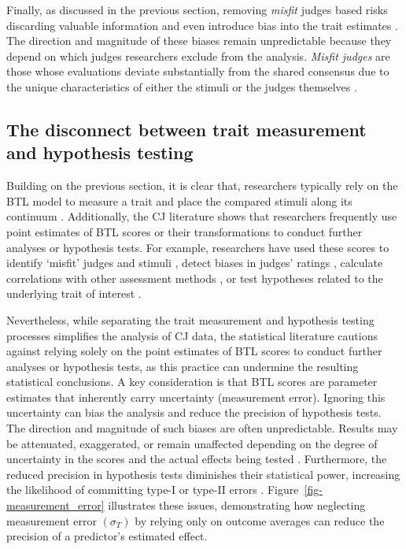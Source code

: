 \documentclass[
  authoryear,
  review,
  1p]{elsarticle}
\begin{document}
Finally, as discussed in the previous section, removing \emph{misfit}
judges based risks discarding valuable information and even introduce
bias into the trait estimates
\citep[chap.~12]{Zimmerman_1994, McElreath_2020}. The direction and
magnitude of these biases remain unpredictable because they depend on
which judges researchers exclude from the analysis. \emph{Misfit judges}
are those whose evaluations deviate substantially from the shared
consensus due to the unique characteristics of either the stimuli or the
judges themselves
\citep{Pollitt_2012a, Pollitt_2012b, vanDaal_et_al_2016, Goossens_et_al_2018}.

\subsection{The disconnect between trait measurement and hypothesis
testing}\label{sec-theory-issue2}

Building on the previous section, it is clear that, researchers
typically rely on the BTL model to measure a trait and place the
compared stimuli along its continuum \citep{Thurstone_1927b}.
Additionally, the CJ literature shows that researchers frequently use
point estimates of BTL scores or their transformations to conduct
further analyses or hypothesis tests. For example, researchers have used
these scores to identify `misfit' judges and stimuli
\citep{Pollitt_2012b, vanDaal_et_al_2016, Goossens_et_al_2018}, detect
biases in judges' ratings \citep{Pollitt_et_al_2003, Pollitt_2012b},
calculate correlations with other assessment methods
\citep{Goossens_et_al_2018, Bouwer_et_al_2023}, or test hypotheses
related to the underlying trait of interest
\citep{Casalicchio_et_al_2015, Bramley_et_al_2019, Boonen_et_al_2020, Bouwer_et_al_2023, vanDaal_et_al_2017, Jones_et_al_2019, Gijsen_et_al_2021}.

Nevertheless, while separating the trait measurement and hypothesis
testing processes simplifies the analysis of CJ data, the statistical
literature cautions against relying solely on the point estimates of BTL
scores to conduct further analyses or hypothesis tests, as this practice
can undermine the resulting statistical conclusions. A key consideration
is that BTL scores are parameter estimates that inherently carry
uncertainty (measurement error). Ignoring this uncertainty can bias the
analysis and reduce the precision of hypothesis tests. The direction and
magnitude of such biases are often unpredictable. Results may be
attenuated, exaggerated, or remain unaffected depending on the degree of
uncertainty in the scores and the actual effects being tested
\citep{McElreath_2020, Kline_et_al_2023, Hoyle_et_al_2023}. Furthermore,
the reduced precision in hypothesis tests diminishes their statistical
power, increasing the likelihood of committing type-I or type-II errors
\citep{McElreath_2020}. Figure~\ref{fig-measurement_error} illustrates
these issues, demonstrating how neglecting measurement error
\((\sigma_{T})\) by relying only on outcome averages can reduce the
precision of a predictor's estimated effect.
\end{document}

